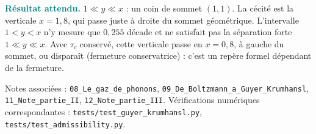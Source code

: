 \documentclass[11pt,a4paper]{article}
\newcommand{\rep}[1]{\par\smallskip\noindent\textcolor{teal}{\textbf{Résultat attendu.}}\; #1\par\smallskip}
\begin{document}
\rep{$1 \ll y \ll x$ : un coin de sommet $(1,1)$. La cécité est la verticale $x = 1{,}8$, qui passe
juste à droite du sommet géométrique. L'intervalle $1<y<x$ n'y mesure que $0{,}255$ décade et ne satisfait pas la séparation forte $1\ll y\ll x$.
Avec $\tau_c$ conservé, cette verticale passe en $x=0{,}8$, à gauche du sommet, ou disparaît (fermeture conservatrice) : c'est un repère formel dépendant de la fermeture.}

\vspace{8pt}
\noindent\small
Notes associées : \texttt{08\_\allowbreak Le\_\allowbreak gaz\_\allowbreak de\_\allowbreak phonons}, \texttt{09\_\allowbreak De\_\allowbreak Boltzmann\_\allowbreak a\_\allowbreak Guyer\_\allowbreak Krumhansl},
\texttt{11\_\allowbreak Note\_\allowbreak partie\_\allowbreak II}, \texttt{12\_\allowbreak Note\_\allowbreak partie\_\allowbreak III}. Vérifications numériques
correspondantes : \texttt{tests/\allowbreak test\_\allowbreak guyer\_\allowbreak krumhansl.py}, \texttt{tests/\allowbreak test\_\allowbreak admissibility.py}.
\end{document}
